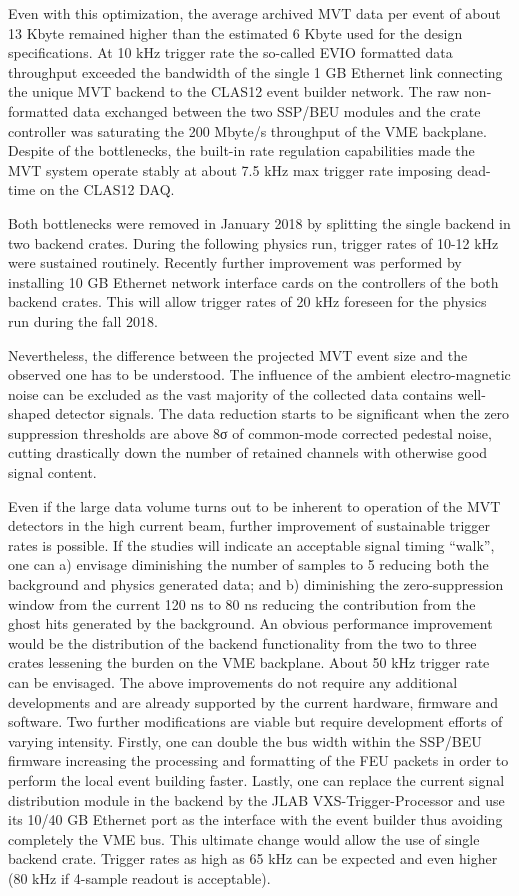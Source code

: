 Even with this optimization, the average archived MVT data per event of about 13 Kbyte remained higher than the estimated 6 Kbyte used for the design specifications. At 10 kHz trigger rate the so-called EVIO formatted data throughput exceeded the bandwidth of the single 1 GB Ethernet link connecting the unique MVT backend to the CLAS12 event builder network. The raw non-formatted data exchanged between the two SSP/BEU modules and the crate controller was saturating the 200 Mbyte/s throughput of the VME backplane. Despite of the bottlenecks, the built-in rate regulation capabilities made the MVT system operate stably at about 7.5 kHz max trigger rate imposing dead-time on the CLAS12 DAQ. 

Both bottlenecks were removed in January 2018 by splitting the single backend in two backend crates. During the following physics run, trigger rates of 10-12 kHz were sustained routinely. Recently further improvement was performed by installing 10 GB Ethernet network interface cards on the controllers of the both backend crates. This will allow trigger rates of 20 kHz foreseen for the physics run during the fall 2018.

Nevertheless, the difference between the projected MVT event size and the observed one has to be understood. The influence of the ambient electro-magnetic noise can be excluded as the vast majority of the collected data contains well-shaped detector signals. The data reduction starts to be significant when the zero suppression thresholds are above 8σ of common-mode corrected pedestal noise, cutting drastically down the number of retained channels with otherwise good signal content.

Even if the large data volume turns out to be inherent to operation of the MVT detectors in the high current beam, further improvement of sustainable trigger rates is possible. If the studies will indicate an acceptable signal timing “walk”, one can a) envisage diminishing the number of samples to 5 reducing both the background and physics generated data; and b) diminishing the zero-suppression window from the current 120 ns to 80 ns reducing the contribution from the ghost hits generated by the background. An obvious performance improvement would be the distribution of the backend functionality from the two to three crates lessening the burden on the VME backplane. About 50 kHz trigger rate can be envisaged. The above improvements do not require any additional developments and are already supported by the current hardware, firmware and software. Two further modifications are viable but require development efforts of varying intensity. Firstly, one can double the bus width within the SSP/BEU firmware increasing the processing and formatting of the FEU packets in order to perform the local event building faster. Lastly, one can replace the current signal distribution module in the backend by the JLAB VXS-Trigger-Processor and use its 10/40 GB Ethernet port as the interface with the event builder thus avoiding completely the VME bus. This ultimate change would allow the use of single backend crate. Trigger rates as high as 65 kHz can be expected and even higher (80 kHz if 4-sample readout is acceptable).
